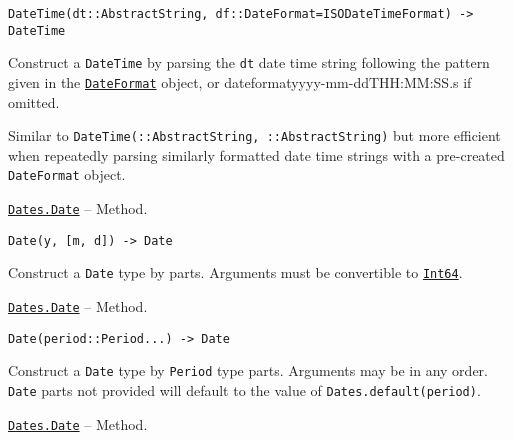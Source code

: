 \begin{adjustwidth}{2em}{0pt}


\begin{verbatim}
DateTime(dt::AbstractString, df::DateFormat=ISODateTimeFormat) -> DateTime
\end{verbatim}

Construct a \texttt{DateTime} by parsing the \texttt{dt} date time string following the pattern given in the \hyperlink{18093459443158853001}{\texttt{DateFormat}} object, or dateformat{\textquotedbl}yyyy-mm-ddTHH:MM:SS.s{\textquotedbl} if omitted.

Similar to \texttt{DateTime(::AbstractString, ::AbstractString)} but more efficient when repeatedly parsing similarly formatted date time strings with a pre-created \texttt{DateFormat} object.



\end{adjustwidth}
\hypertarget{6792321022749859}{}
\hyperlink{6792321022749859}{\texttt{Dates.Date}}  -- {Method.}

\begin{adjustwidth}{2em}{0pt}


\begin{verbatim}
Date(y, [m, d]) -> Date
\end{verbatim}

Construct a \texttt{Date} type by parts. Arguments must be convertible to \hyperlink{7720564657383125058}{\texttt{Int64}}.



\end{adjustwidth}
\hypertarget{13807007941640052204}{}
\hyperlink{13807007941640052204}{\texttt{Dates.Date}}  -- {Method.}

\begin{adjustwidth}{2em}{0pt}


\begin{verbatim}
Date(period::Period...) -> Date
\end{verbatim}

Construct a \texttt{Date} type by \texttt{Period} type parts. Arguments may be in any order. \texttt{Date} parts not provided will default to the value of \texttt{Dates.default(period)}.



\end{adjustwidth}
\hypertarget{17065863436476145585}{}
\hyperlink{17065863436476145585}{\texttt{Dates.Date}}  -- {Method.}

